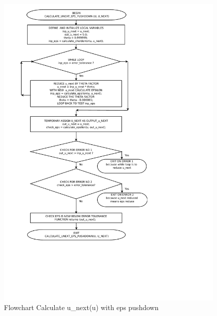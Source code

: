 \begin{figure}
	\caption{Flowchart Calculate u\_next(u) with eps pushdown}
	\label{05-Calculate-u-next-eps-pushdown-flowchart.pdf}
	\includegraphics[width=1.40\textwidth,]{Images/Chap3/05-Calculate-u-next-eps-pushdown-flowchart.pdf} 
\end{figure}

\clearpage
\pagebreak

